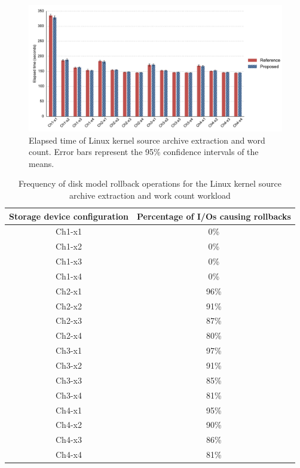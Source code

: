 \begin{figure}[htpb]
	\centering
	\includegraphics[width=\textwidth]{figures/ch6-fig-11.pdf}
	\caption[Elapsed time of Linux kernel source archive extraction and word count.]{\label{fig:ch6-fig-11}Elapsed time of Linux kernel source archive extraction and word count. Error bars represent the 95\% confidence intervals of the means.}
\end{figure}

\begin{table}[htbp]%
	\centering
	\caption{Frequency of disk model rollback operations for the Linux kernel source archive extraction and work count workload}\label{tab:ch6-7-rollback}
	\noindent\begin{tabular}{cc}
		\toprule
		Storage device configuration &
		Percentage of I/Os causing rollbacks \\
		\midrule
		Ch1-x1 & 0\% \\
		Ch1-x2 & 0\% \\
		Ch1-x3 & 0\% \\
		Ch1-x4 & 0\% \\
		Ch2-x1 & 96\% \\
		Ch2-x2 & 91\% \\
		Ch2-x3 & 87\% \\
		Ch2-x4 & 80\% \\
		Ch3-x1 & 97\% \\
		Ch3-x2 & 91\% \\
		Ch3-x3 & 85\% \\
		Ch3-x4 & 81\% \\
		Ch4-x1 & 95\% \\
		Ch4-x2 & 90\% \\
		Ch4-x3 & 86\% \\
		Ch4-x4 & 81\% \\
		\bottomrule
	\end{tabular}
\end{table}%

